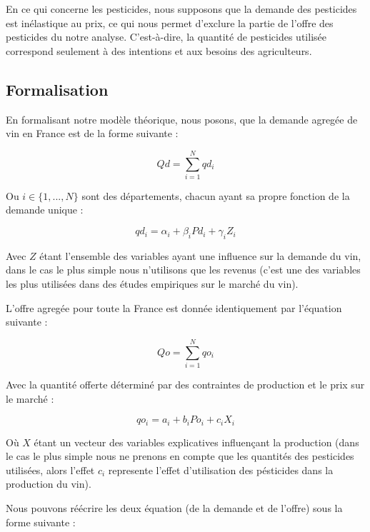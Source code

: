 \documentclass[11pt,]{article}
\begin{document}
En ce qui concerne les pesticides, nous supposons que la demande des
pesticides est inélastique au prix, ce qui nous permet d'exclure la
partie de l'offre des pesticides du notre analyse. C'est-à-dire, la
quantité de pesticides utilisée correspond seulement à des intentions et
aux besoins des agriculteurs.

\hypertarget{formalisation}{%
\subsection{Formalisation}\label{formalisation}}

En formalisant notre modèle théorique, nous posons, que la demande
agregée de vin en France est de la forme suivante :

\begin{equation}
    Qd = \sum_{i = 1}^{N} qd_i 
\end{equation}

Ou \(i \in \{1, ..., N\}\) sont des départements, chacun ayant sa propre
fonction de la demande unique :

\begin{equation}
    qd_i = \alpha_i + \beta_i Pd_i + \gamma_i Z_i 
\end{equation}

Avec \(Z\) étant l'ensemble des variables ayant une influence sur la
demande du vin, dans le cas le plus simple nous n'utilisons que les
revenus (c'est une des variables les plus utilisées dans des études
empiriques sur le marché du vin).

L'offre agregée pour toute la France est donnée identiquement par
l'équation suivante :

\begin{equation}
    Qo = \sum_{i = 1}^{N} qo_i
\end{equation}

Avec la quantité offerte déterminé par des contraintes de production et
le prix sur le marché :

\begin{equation}
    qo_i = a_i + b_i Po_i + c_i X_i
\end{equation}

Où \(X\) étant un vecteur des variables explicatives influençant la
production (dans le cas le plus simple nous ne prenons en compte que les
quantités des pesticides utilisées, alors l'effet \(c_i\) represente
l'effet d'utilisation des pésticides dans la production du vin).

Nous pouvons réécrire les deux équation (de la demande et de l'offre)
sous la forme suivante :
\end{document}
